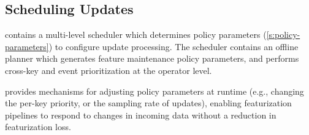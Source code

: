 %

%



\subsection{Scheduling Updates}
\label{ss:design:scheduler}
%
\system{} contains a multi-level scheduler which determines policy parameters (\cref{s:policy-parameters}) to configure update processing. 
The scheduler contains an offline planner which generates feature maintenance policy parameters, and performs cross-key and event prioritization at the operator level. 

\system{} provides mechanisms for adjusting policy parameters at runtime (e.g., changing the per-key priority, or the sampling rate of updates), enabling featurization pipelines to respond to changes in incoming data without a reduction in featurization loss.



